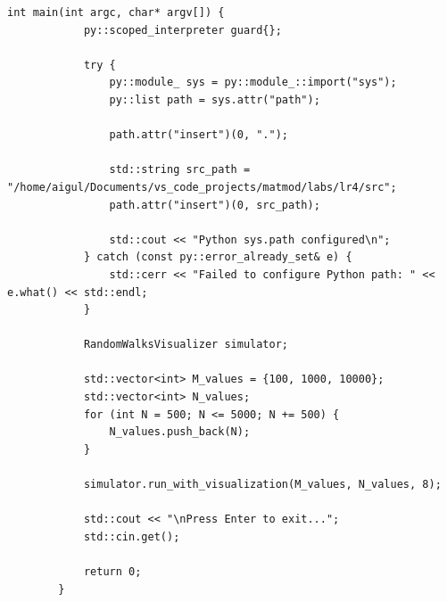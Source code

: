 \documentclass[14pt,a4paper]{extarticle}
\theoremstyle{plain}
\begin{document}
\begin{lstlisting}[title=main.cpp, gobble=16, breaklines=true, showspaces=false, showtabs=false, breakatwhitespace=true]
		int main(int argc, char* argv[]) {
			py::scoped_interpreter guard{};
			
			try {
				py::module_ sys = py::module_::import("sys");
				py::list path = sys.attr("path");
				
				path.attr("insert")(0, ".");
				
				std::string src_path = "/home/aigul/Documents/vs_code_projects/matmod/labs/lr4/src";
				path.attr("insert")(0, src_path);
				
				std::cout << "Python sys.path configured\n";
			} catch (const py::error_already_set& e) {
				std::cerr << "Failed to configure Python path: " << e.what() << std::endl;
			}
			
			RandomWalksVisualizer simulator;
			
			std::vector<int> M_values = {100, 1000, 10000};
			std::vector<int> N_values;
			for (int N = 500; N <= 5000; N += 500) {
				N_values.push_back(N);
			}
			
			simulator.run_with_visualization(M_values, N_values, 8);
			
			std::cout << "\nPress Enter to exit...";
			std::cin.get();
			
			return 0;
		}
	\end{lstlisting}
	
\end{document}
